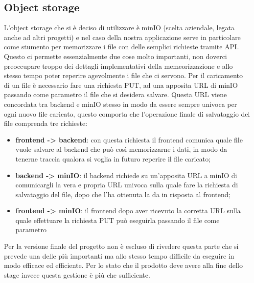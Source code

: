 \subsection{Object storage}
L'object storage che si è deciso di utilizzare è minIO (scelta aziendale, legata anche ad altri progetti) e nel caso della nostra applicazione serve in particolare come stumento
per memorizzare i file con delle semplici richieste tramite API.
Questo ci permette essenzialmente due cose molto importanti, non doverci preoccupare troppo dei dettagli implementativi della memeorizzazione e allo stesso tempo poter
reperire agevolmente i file che ci servono. Per il caricamento di un file è necessario fare una richiesta PUT, ad una apposita URL di minIO passando come parametro il file che si desidera salvare.
Questa URL viene concordata tra backend e minIO stesso in modo da essere sempre univoca per ogni nuovo file caricato, questo comporta che l'operazione finale di salvataggio del file
comprenda tre richieste:
\begin{itemize}
  \item \textbf{frontend -> backend}: con questa richiesta il frontend comunica quale file vuole salvare al backend che può così memorizzarne i dati, in modo da tenerne traccia qualora si voglia in
        futuro reperire il file caricato;
  \item \textbf{backend -> minIO}: il backend richiede su un'apposita URL a minIO di comunicargli la vera e propria URL univoca sulla quale fare la richiesta di salvataggio del file,
        dopo che l'ha ottenuta la da in risposta al frontend;
  \item \textbf{frontend -> minIO}: il frontend dopo aver ricevuto la corretta URL sulla quale effettuare la richiesta PUT può eseguirla passando il file come parametro
\end{itemize}
Per la versione finale del progetto non è escluso di rivedere questa parte che si prevede una delle più importanti ma allo stesso tempo difficile da eseguire in modo efficace ed
efficiente. Per lo stato che il prodotto deve avere alla fine dello stage invece questa gestione è più che sufficiente.


